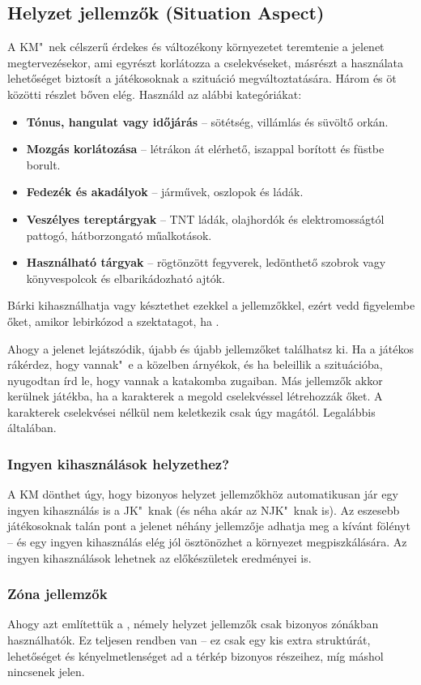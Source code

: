 \subsection[Helyzet jellemzők]{Helyzet jellemzők (Situation Aspect)}

A KM"~nek célszerű érdekes és változékony környezetet teremtenie a jelenet megtervezésekor, ami egyrészt korlátozza a cselekvéseket, másrészt a használata lehetőséget biztosít a játékosoknak a szituáció megváltoztatására. Három és öt közötti részlet bőven elég. Használd az alábbi kategóriákat:

\begin{itemize}
    \item \textbf{Tónus, hangulat vagy időjárás} -- sötétség, villámlás és süvöltő orkán.
    \item \textbf{Mozgás korlátozása} -- létrákon át elérhető, iszappal borított és füstbe borult.
    \item \textbf{Fedezék és akadályok} -- járművek, oszlopok és ládák.
    \item \textbf{Veszélyes tereptárgyak} -- TNT ládák, olajhordók és elektromosságtól pattogó, hátborzongató műalkotások.
    \item \textbf{Használható tárgyak} -- rögtönzött fegyverek, ledönthető szobrok vagy könyvespolcok és elbarikádozható ajtók.
\end{itemize}

Bárki kihasználhatja vagy késztethet ezekkel a jellemzőkkel, ezért vedd figyelembe őket, amikor lebirkózod a szektatagot, ha .

Ahogy a jelenet lejátszódik, újabb és újabb jellemzőket találhatsz ki. Ha a játékos rákérdez, hogy vannak"~e a közelben árnyékok, és ha beleillik a szituációba, nyugodtan írd le, hogy  vannak a katakomba zugaiban. Más jellemzők akkor kerülnek játékba, ha a karakterek a megold cselekvéssel létrehozzák őket. A karakterek cselekvései nélkül nem keletkezik csak úgy  magától. Legalábbis általában.

\subsubsection{Ingyen kihasználások helyzethez?}

A KM dönthet úgy, hogy bizonyos helyzet jellemzőkhöz automatikusan jár egy ingyen kihasználás is a JK"~knak (és néha akár az NJK"~knak is). Az eszesebb játékosoknak talán pont a jelenet néhány jellemzője adhatja meg a kívánt fölényt -- és egy ingyen kihasználás elég jól ösztönözhet a környezet megpiszkálására. Az ingyen kihasználások lehetnek az előkészületek eredményei is.

\subsubsection{Zóna jellemzők}

Ahogy azt említettük a , némely helyzet jellemzők csak bizonyos zónákban használhatók. Ez teljesen rendben van -- ez csak egy kis extra struktúrát, lehetőséget és kényelmetlenséget ad a térkép bizonyos részeihez, míg máshol nincsenek jelen.

